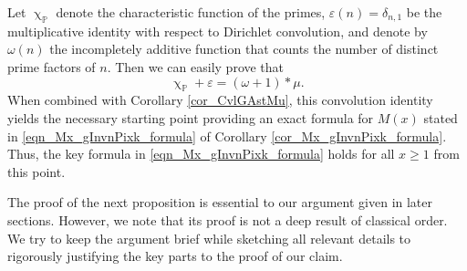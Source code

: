 \documentclass[11pt,reqno,a4letter]{article}
\numberwithin{figure}{section}
\numberwithin{table}{section}
\renewcommand{\chi}{\upchi}
\theoremstyle{plain}
\numberwithin{theorem}{section}
\theoremstyle{definition}
\begin{document}
Let $\chi_{\mathbb{P}}$ denote the characteristic function of the primes, 
$\varepsilon(n) = \delta_{n,1}$ be the multiplicative identity with respect to Dirichlet convolution, 
and denote by $\omega(n)$ the incompletely additive function that counts the number of 
distinct prime factors of $n$. Then we can easily prove that 
\begin{equation}
\label{eqn_AntiqueDivisorSumIdent} 
\chi_{\mathbb{P}} + \varepsilon = (\omega + 1) \ast \mu. 
\end{equation} 
When combined with Corollary \ref{cor_CvlGAstMu}, this 
convolution identity yields the necessary starting point providing an exact 
formula for $M(x)$ stated in \eqref{eqn_Mx_gInvnPixk_formula} of 
Corollary \ref{cor_Mx_gInvnPixk_formula}. Thus, the key formula in \eqref{eqn_Mx_gInvnPixk_formula} 
holds for all $x \geq 1$ from this point. 

The proof of the next proposition is essential to our argument given in later sections. However, we note that 
its proof is not a deep result of classical order. 
We try to keep the argument brief while sketching all relevant details to rigorously justifying the key parts 
to the proof of our claim. 
\end{document}
